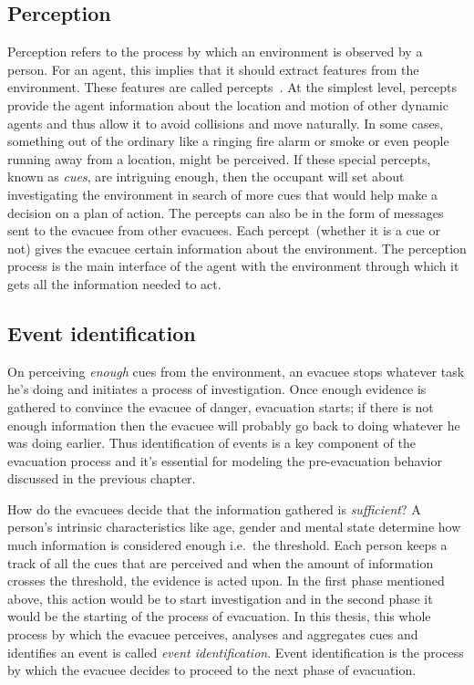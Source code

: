 \subsection{Perception}
\label{IBEVAC:IBP}
	Perception refers to the process by which an environment is observed by a person. For an agent, this implies that it should extract features from the environment. These features are called percepts~\cite{Russel:1995vi}. At the simplest level, percepts provide the agent information about the location and motion of other dynamic agents and thus allow it to avoid collisions and move naturally. In some cases, something out of the ordinary like a ringing fire alarm or smoke or even people running away from a location, might be perceived. If these special percepts, known as \emph{cues}, are intriguing enough, then the occupant will set about investigating the environment in search of more cues that would help make a decision on a plan of action. The percepts can also be in the form of messages sent to the evacuee from other evacuees. Each percept~(whether it is a cue or not) gives the evacuee certain information about the environment. The perception process is the main interface of the agent with the environment through which it gets all the information needed to act.

\subsection{Event identification} %
\label{IBEVAC:EventIdentification}
	On perceiving \emph{enough} cues from the environment, an evacuee stops whatever task he's doing and initiates a process of investigation. Once enough evidence is gathered to convince the evacuee of danger, evacuation starts; if there is not enough information then the evacuee will probably go back to doing whatever he was doing earlier. Thus identification of events is a key component of the evacuation process and it's essential for modeling the pre-evacuation behavior discussed in the previous chapter.

    How do the evacuees decide that the information gathered is \emph{sufficient}? A person's intrinsic characteristics like age, gender and mental state determine how much information is considered enough i.e.\ the threshold. Each person keeps a track of all the cues that are perceived and when the amount of information crosses the threshold, the evidence is acted upon. In the first phase mentioned above, this action would be to start investigation and in the second phase it would be the starting of the process of evacuation. In this thesis, this whole process by which the evacuee perceives, analyses and aggregates cues and identifies an event is called \emph{event identification}. Event identification is the process by which the evacuee decides to proceed to the next phase of evacuation.

